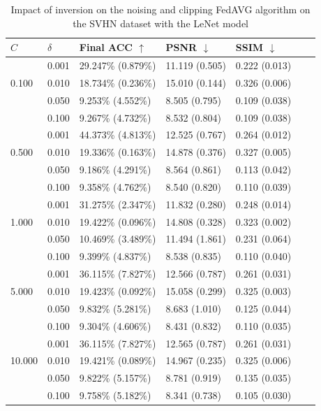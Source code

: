 \documentclass[conference,compsoc]{IEEEtran}
\begin{document}
\begin{table}[H]
\centering
\caption{Impact of inversion on the noising and clipping FedAVG algorithm on the SVHN dataset with the LeNet model}
\label{table:dp_svhn_lenet}
\begin{tabular}{lllllll}
\hline
$C$ & $\delta$ & \textbf{Final ACC} $\uparrow$ & \textbf{PSNR} $\downarrow$ & \textbf{SSIM} $\downarrow$ \\
\hline
\multirow{3}{*}{0.100} & 0.001 & 29.247\% (0.879\%) & 11.119 (0.505) & 0.222 (0.013) \\
& 0.010 & 18.734\% (0.236\%) & 15.010 (0.144) & 0.326 (0.006) \\
& 0.050 & 9.253\% (4.552\%) & 8.505 (0.795) & 0.109 (0.038) \\
& 0.100 & 9.267\% (4.732\%) & 8.532 (0.804) & 0.109 (0.038) \\
\hline
\multirow{3}{*}{0.500} & 0.001 & 44.373\% (4.813\%) & 12.525 (0.767) & 0.264 (0.012) \\
& 0.010 & 19.336\% (0.163\%) & 14.878 (0.376) & 0.327 (0.005) \\
& 0.050 & 9.186\% (4.291\%) & 8.564 (0.861) & 0.113 (0.042) \\
& 0.100 & 9.358\% (4.762\%) & 8.540 (0.820) & 0.110 (0.039) \\
\hline
\multirow{3}{*}{1.000} & 0.001 & 31.275\% (2.347\%) & 11.832 (0.280) & 0.248 (0.014) \\
& 0.010 & 19.422\% (0.096\%) & 14.808 (0.328) & 0.323 (0.002) \\
& 0.050 & 10.469\% (3.489\%) & 11.494 (1.861) & 0.231 (0.064) \\
& 0.100 & 9.399\% (4.837\%) & 8.538 (0.835) & 0.110 (0.040) \\
\hline
\multirow{3}{*}{5.000} & 0.001 & 36.115\% (7.827\%) & 12.566 (0.787) & 0.261 (0.031) \\
& 0.010 & 19.423\% (0.092\%) & 15.058 (0.299) & 0.325 (0.003) \\
& 0.050 & 9.832\% (5.281\%) & 8.683 (1.010) & 0.125 (0.044) \\
& 0.100 & 9.304\% (4.606\%) & 8.431 (0.832) & 0.110 (0.035) \\
\hline
\multirow{3}{*}{10.000} & 0.001 & 36.115\% (7.827\%) & 12.565 (0.787) & 0.261 (0.031) \\
& 0.010 & 19.421\% (0.089\%) & 14.967 (0.235) & 0.325 (0.006) \\
& 0.050 & 9.822\% (5.157\%) & 8.781 (0.919) & 0.135 (0.035) \\
& 0.100 & 9.758\% (5.182\%) & 8.341 (0.738) & 0.105 (0.030) \\
\hline
\end{tabular}
\end{table}
\end{document}
